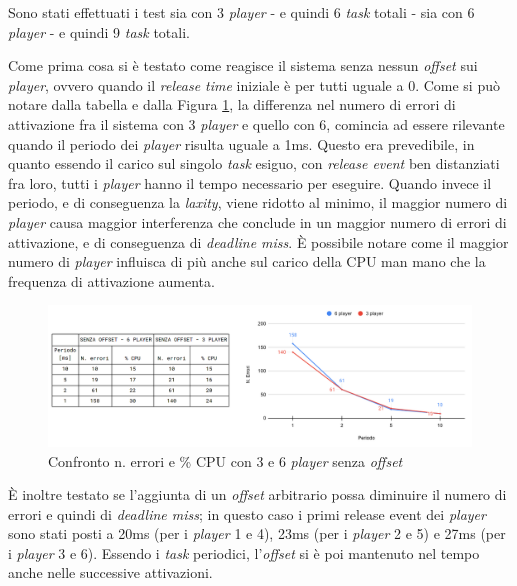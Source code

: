 \documentclass{article}
\begin{document}
Sono stati effettuati i test sia con 3 \textit{player} - e quindi 6 \textit{task} totali - sia con 6 \textit{player} - e quindi 9 \textit{task} totali. 

Come prima cosa si è testato come reagisce il sistema senza nessun \textit{offset} sui \textit{player}, ovvero quando il \textit{release time} iniziale è per tutti uguale a 0. Come si può notare dalla tabella e dalla Figura \ref{noC-noO}, la differenza nel numero di errori di attivazione fra il sistema con 3 \textit{player} e quello con 6, comincia ad essere rilevante quando il periodo dei \textit{player} risulta uguale a 1ms. Questo era prevedibile, in quanto essendo il carico sul singolo \textit{task} esiguo, con \textit{release event} ben distanziati fra loro, tutti i \textit{player} hanno il tempo necessario per eseguire. Quando invece il periodo, e di conseguenza la \textit{laxity}, viene ridotto al minimo, il maggior numero di \textit{player} causa maggior interferenza che conclude in un maggior numero di errori di attivazione, e di conseguenza di \textit{deadline miss}. È possibile notare come il maggior numero di \textit{player} influisca di più anche sul carico della CPU man mano che la frequenza di attivazione aumenta.
\begin{figure}[H]
	\centering
	\includegraphics[width=6in]{image/NO_CARICO-AUTOSTART.png}
	\caption{Confronto n. errori e \% CPU con 3 e 6 \textit{player} senza \textit{offset}}
	\label{noC-noO}
\end{figure}
È inoltre testato se l'aggiunta di un \textit{offset} arbitrario possa diminuire il numero di errori e quindi di \textit{deadline miss}; in questo caso i primi release event dei \textit{player} sono stati posti a 20ms (per i \textit{player} 1 e 4), 23ms (per i \textit{player} 2 e 5) e 27ms (per i \textit{player} 3 e 6). Essendo i \textit{task} periodici, l'\textit{offset} si è poi mantenuto nel tempo anche nelle successive attivazioni.
\end{document}
